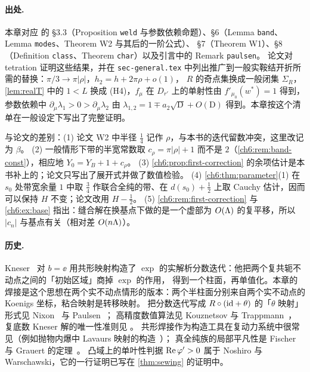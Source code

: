 \notes

\paragraph{出处.}
本章对应 \cite{KneserPaper} 的 §3.3（Proposition \texttt{weld} 与参数依赖命题）、§6（Lemma \texttt{band}、Lemma \texttt{modes}、Theorem W2 与其后的一阶公式）、
§7（Theorem W1）、§8（Definition \texttt{class}、Theorem \texttt{char}）以及引言中的 Remark \texttt{paulsen}。
论文对 tetration 证明这些结果，并在 \texttt{sec-general.tex} 中列出推广到一般实鞍结开折所需的替换：$\pi/3\to\pi|\rho|$，$h_2=h+2\pi\rho+o(1)$，
$R$ 的奇点集换成一般闭集 $\Sigma_R$，\cref{lem:realT} 中的 $1<L$ 换成 (H4)，$f_\mu$ 在 $D_{r'}$ 上的单射性由 $f'_{\mu_0}(w^*)=1$ 得到，
参数依赖中 $\partial_\mu\lambda_1>0>\partial_\mu\lambda_2$ 由 $\lambda_{1,2}=1\mp a_2\sqrt{\mathrm D}+O(\mathrm D)$ 得到。本章按这个清单在一般设定下写出了完整证明。

与论文的差别：(1) 论文 W2 中半径 $\tfrac14$ 记作 $\rho$，与本书的迭代留数冲突，这里改记为 $\beta$。
(2) 一般情形下带的半宽常数取 $c_\rho=\pi|\rho|+1$ 而不是 $2$（\cref{ch6:rem:band-const}），相应地 $Y_0=Y_B+1+c_\rho$。
(3) \cref{ch6:prop:first-correction} 的余项估计是本书补上的；论文只写出了展开式并做了数值检验。
(4) \cref{ch6:thm:parameter}(1) 在 $s_0$ 处带宽余量 $1$ 中取 $\tfrac34$ 作联合全纯的带、在 $d(s_0)+\tfrac12$ 上取 Cauchy 估计，因而可以保持 $H$ 不变；论文改用 $H-\tfrac12$。
(5) \cref{ch6:rem:first-correction} 与 \cref{ch6:ex:base} 指出：缝合解在换基点下做的是一个虚部为 $O(\Lambda)$ 的复平移，所以 $|c_n|$ 与基点有关（相对差 $O(n\Lambda)$）。

\paragraph{历史.}
Kneser~\cite{Kneser1950} 对 $b=\ee$ 用共形映射构造了 $\exp$ 的实解析分数迭代：他把两个复共轭不动点之间的「初始区域」商掉 $\exp$ 的作用，
得到一个柱面，再单值化。本章的焊接是这个思想在两个实不动点情形的版本：两个半柱面分别来自两个实不动点的 Koenigs 坐标，粘合映射是转移映射。
把分数迭代写成 $R\circ(\mathrm{id}+\theta)$ 的「$\theta$ 映射」形式见 Nixon~\cite{Nixon2022} 与 Paulsen~\cite{Paulsen2019}；
高精度数值算法见 Kouznetsov 与 Trappmann~\cite{Kouznetsov2009,KouznetsovTrappmann2010,KouznetsovTrappmann2012}，
复底数 Kneser 解的唯一性准则见 \cite{TrappmannKouznetsov2011,PaulsenCowgill2017}。
共形焊接作为构造工具在复动力系统中很常见（例如抛物内爆中 Lavaurs 映射的构造~\cite{Lavaurs1989,Shishikura2000}）；
真全纯族的局部平凡性是 Fischer 与 Grauert 的定理~\cite{FischerGrauert1965}。
凸域上的单叶性判据 $\operatorname{Re}\varphi'>0$ 属于 Noshiro 与 Warschawski，它的一行证明已写在 \cref{thm:sewing} 的证明中。

